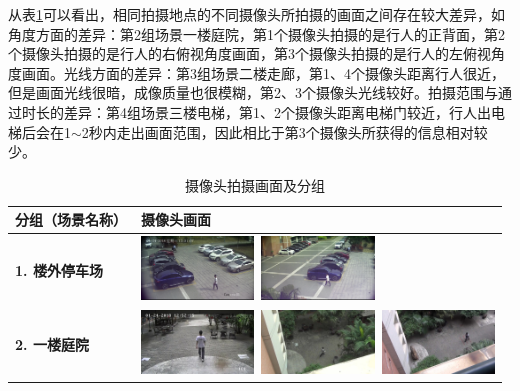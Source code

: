 从表\ref{tab:cameraslayout}可以看出，相同拍摄地点的不同摄像头所拍摄的画面之间存在较大差异，如角度方面的差异：第2组场景一楼庭院，第1个摄像头拍摄的是行人的正背面，第2个摄像头拍摄的是行人的右俯视角度画面，第3个摄像头拍摄的是行人的左俯视角度画面。光线方面的差异：第3组场景二楼走廊，第1、4个摄像头距离行人很近，但是画面光线很暗，成像质量也很模糊，第2、3个摄像头光线较好。拍摄范围与通过时长的差异：第4组场景三楼电梯，第1、2个摄像头距离电梯门较近，行人出电梯后会在1$\sim$2秒内走出画面范围，因此相比于第3个摄像头所获得的信息相对较少。
\begin{table}[ht]
\centering
\caption{摄像头拍摄画面及分组}
\label{tab:cameraslayout}
\renewcommand{\arraystretch}{1.5}%
\begin{tabular}{>{\centering\bfseries}m{} >{\centering\arraybackslash}m{}}
\toprule
分组（场景名称） & \textbf{摄像头画面} \\
\midrule
1. 楼外停车场 & \includegraphics[width=30mm]{figure/1-1}~\includegraphics[width=30mm]{figure/1-2} \\
2. 一楼庭院 & \includegraphics[width=30mm]{figure/1-4}~\includegraphics[width=30mm]{figure/1-5}~\includegraphics[width=30mm]{figure/1-6} \\

\end{tabular}
\end{table}
